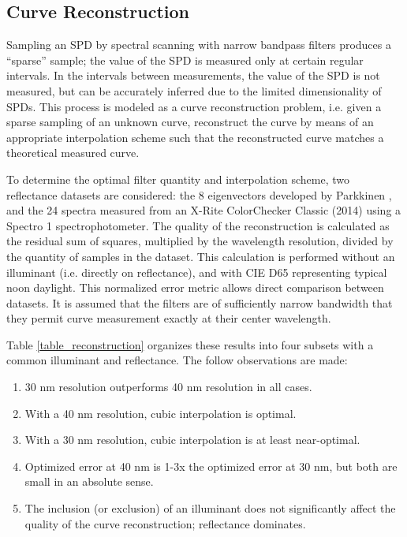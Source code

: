 \documentclass[twocolumn,10pt]{asme2ej}
\newcommand{\id}{\hspace{6 mm}}
\begin{document}
\subsection{Curve Reconstruction}
\label{curve_reconstruction}

Sampling an SPD by spectral scanning with narrow bandpass filters produces a ``sparse'' sample; the value of the SPD is measured only at certain regular intervals. In the intervals between measurements, the value of the SPD is not measured, but can be accurately inferred due to the limited dimensionality of SPDs. This process is modeled as a curve reconstruction problem, i.e. given a sparse sampling of an unknown curve, reconstruct the curve by means of an appropriate interpolation scheme such that the reconstructed curve matches a theoretical measured curve.

\id To determine the optimal filter quantity and interpolation scheme, two reflectance datasets are considered: the 8 eigenvectors developed by Parkkinen \cite{Parkkinen}, and the 24 spectra measured from an X-Rite ColorChecker Classic (2014) using a Spectro 1 spectrophotometer. The quality of the reconstruction is calculated as the residual sum of squares, multiplied by the wavelength resolution, divided by the quantity of samples in the dataset. This calculation is performed without an illuminant (i.e. directly on reflectance), and with CIE D65 representing typical noon daylight. This normalized error metric allows direct comparison between datasets. It is assumed that the filters are of sufficiently narrow bandwidth that they permit curve measurement exactly at their center wavelength.

\id Table \ref{table_reconstruction} organizes these results into four subsets with a common illuminant and reflectance. The follow observations are made:

\begin{enumerate}
  \item 30 nm resolution outperforms 40 nm resolution in all cases.
  \item With a 40 nm resolution, cubic interpolation is optimal.
  \item With a 30 nm resolution, cubic interpolation is at least near-optimal.
  \item Optimized error at 40 nm is 1-3x the optimized error at 30 nm, but both are small in an absolute sense.
  \item The inclusion (or exclusion) of an illuminant does not significantly affect the quality of the curve reconstruction; reflectance dominates.
\end{enumerate}
\end{document}
